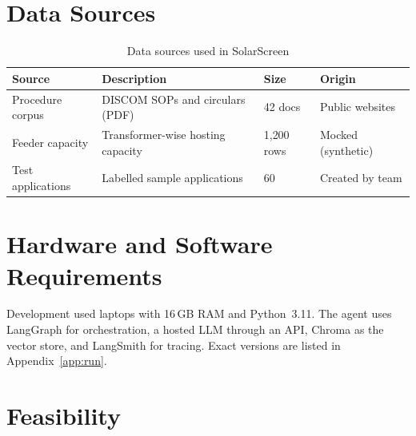 \documentclass[12pt,a4paper,oneside]{report}
\newif\ifguidance
\newcommand{\guide}[1]{%
  \ifguidance
  \begin{tcolorbox}[enhanced,breakable,colback=guidebg,colframe=bmsblue,
    boxrule=0.6pt,arc=2pt,left=6pt,right=6pt,top=4pt,bottom=4pt,
    fonttitle=\bfseries\small,title={What to write here},
    before upper={\small\setstretch{1.1}}]
  #1
  \end{tcolorbox}
  \fi}
\newcommand{\dodont}[2]{%
  \ifguidance
  \begin{tcolorbox}[enhanced,breakable,sidebyside,sidebyside align=top seam,
    colback=dobg,colbacklower=dontbg,colframe=gray!60,boxrule=0.5pt,arc=2pt,
    lefthand ratio=0.5,left=5pt,right=5pt,top=4pt,bottom=4pt,
    fontupper=\small\setstretch{1.05},fontlower=\small\setstretch{1.05}]
  \textbf{\textcolor{ForestGreen}{\checkmark\ Do}}
  \begin{itemize}[leftmargin=12pt,itemsep=1pt,topsep=2pt]#1\end{itemize}
  \tcblower
  \textbf{\textcolor{BrickRed}{$\times$ Don't}}
  \begin{itemize}[leftmargin=12pt,itemsep=1pt,topsep=2pt]#2\end{itemize}
  \end{tcolorbox}
  \fi}
\newenvironment{sample}
  {\par\noindent{\footnotesize\bfseries\textcolor{BrickRed}{[SAMPLE --- replace with your own content]}}\par\color{samplecol}}
  {\par\medskip}
\begin{document}
\section{Data Sources}
\guide{For each data source give its origin, size, format, licence, and how you obtained or
created it. If any data is synthetic or mocked, say so explicitly.}
\dodont{\item State size, format and licence for each source.
\item Mark synthetic or mocked data clearly.
}
{\item Do not use data whose licence forbids it.
\item Do not hide that data is synthetic.
}
\begin{sample}
\begin{table}[H]
\centering
\caption{Data sources used in SolarScreen}
\label{tab:data}
\small
\begin{tabularx}{\linewidth}{@{}l X l l@{}}
\toprule
\textbf{Source} & \textbf{Description} & \textbf{Size} & \textbf{Origin} \\ \midrule
Procedure corpus & DISCOM SOPs and circulars (PDF) & 42 docs & Public websites \\
Feeder capacity & Transformer-wise hosting capacity & 1{,}200 rows & Mocked (synthetic) \\
Test applications & Labelled sample applications & 60 & Created by team \\
\bottomrule
\end{tabularx}
\end{table}
\end{sample}

\section{Hardware and Software Requirements}
\guide{List the hardware and software actually used, with versions.}
\dodont{\item Give exact versions in the appendix.
}
{\item Do not list generic requirements such as ``a computer with internet''.
}
\begin{sample}
Development used laptops with 16\,GB RAM and Python~3.11. The agent uses LangGraph for
orchestration, a hosted LLM through an API, Chroma as the vector store, and LangSmith for tracing.
Exact versions are listed in Appendix~\ref{app:run}.
\end{sample}

\section{Feasibility}
\guide{Briefly discuss technical feasibility, cost (API usage), and time, and how you limited the scope
to finish within the semester.}
\dodont{\item Estimate API cost per run and in total.
}
{\item Do not ignore cost or rate limits.
}
\end{document}
